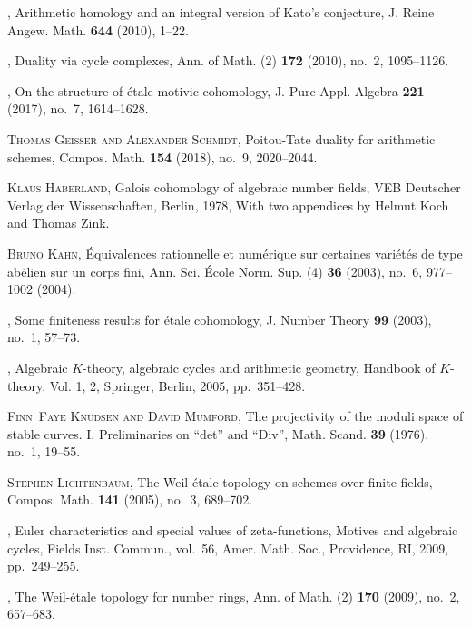 \documentclass[draft,leqno,12pt]{article}
\theoremstyle{plain}
\theoremstyle{definition}
\begin{document}
\begin{thebibliography}{99}
\bysame, Arithmetic homology and an integral version of {K}ato's
  conjecture, J. Reine Angew. Math. \textbf{644} (2010), 1--22.

\bysame, Duality via cycle complexes, Ann. of Math. (2) \textbf{172}
  (2010), no.~2, 1095--1126.

\bysame, On the structure of \'{e}tale motivic cohomology, J. Pure Appl.
  Algebra \textbf{221} (2017), no.~7, 1614--1628.

\textsc{Thomas Geisser and Alexander Schmidt}, Poitou-{T}ate duality for
  arithmetic schemes, Compos. Math. \textbf{154} (2018), no.~9, 2020--2044.

\textsc{Klaus Haberland}, Galois cohomology of algebraic number fields, VEB
  Deutscher Verlag der Wissenschaften, Berlin, 1978, With two appendices by
  Helmut Koch and Thomas Zink.

\textsc{Bruno Kahn}, \'{E}quivalences rationnelle et num\'{e}rique sur certaines
  vari\'{e}t\'{e}s de type ab\'{e}lien sur un corps fini, Ann. Sci. \'{E}cole
  Norm. Sup. (4) \textbf{36} (2003), no.~6, 977--1002 (2004).

\bysame, Some finiteness results for \'{e}tale cohomology, J. Number
  Theory \textbf{99} (2003), no.~1, 57--73.

\bysame, Algebraic {$K$}-theory, algebraic cycles and arithmetic
  geometry, Handbook of {$K$}-theory. {V}ol. 1, 2, Springer, Berlin, 2005,
  pp.~351--428.

\textsc{Finn~Faye Knudsen and David Mumford}, The projectivity of the moduli space
  of stable curves. {I}. {P}reliminaries on ``det'' and ``{D}iv'', Math.
  Scand. \textbf{39} (1976), no.~1, 19--55.

\textsc{Stephen Lichtenbaum}, The {W}eil-\'{e}tale topology on schemes over finite
  fields, Compos. Math. \textbf{141} (2005), no.~3, 689--702.

\bysame, Euler characteristics and special values of zeta-functions,
  Motives and algebraic cycles, Fields Inst. Commun., vol.~56, Amer. Math.
  Soc., Providence, RI, 2009, pp.~249--255.

\bysame, The {W}eil-\'{e}tale topology for number rings, Ann. of Math.
  (2) \textbf{170} (2009), no.~2, 657--683.


\end{thebibliography}
\end{document}
